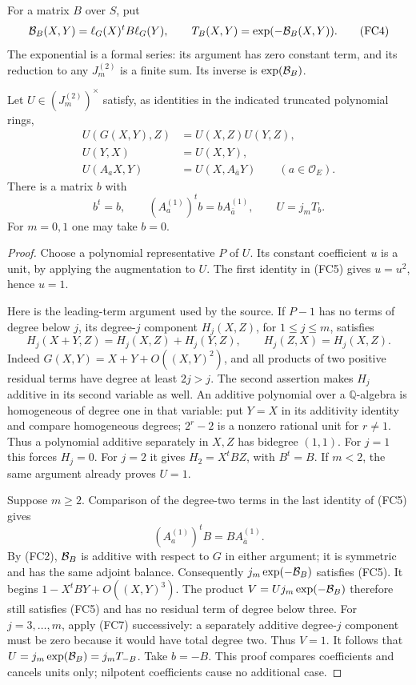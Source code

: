 For a matrix \(B\) over \(S\), put
\[
 {\cal B}_B(X,Y)=\ell_G(X)^tB\ell_G(Y),\qquad
 T_B(X,Y)=\exp(-{\cal B}_B(X,Y)).
 \tag{FC4}
\]
The exponential is a formal series: its argument has
zero constant term, and its reduction to any \(J_m^{(2)}\)
is a finite sum.  Its inverse is \(\exp({\cal B}_B)\).

\begin{srlemma}
\label{lem:sr-source-pair-discrepancy-exponential}
Let \(U\in(J_m^{(2)})^\times\) satisfy, as identities in
the indicated truncated polynomial rings,
\[
 \begin{split}
 U(G(X,Y),Z)&=U(X,Z)U(Y,Z),\\
 U(Y,X)&=U(X,Y),\\
 U(A_aX,Y)&=U(X,A_{\bar a}Y)\qquad(a\in\mathcal O_E).
 \end{split}                                                   \tag{FC5}
\]
There is a matrix \(b\) with
\[
 b^t=b,\qquad (A_a^{(1)})^tb=bA_{\bar a}^{(1)},\qquad
                         U=j_mT_b.                           \tag{FC6}
\]
For \(m=0,1\) one may take \(b=0\).
\end{srlemma}
\begin{proof}
Choose a polynomial representative \(P\) of \(U\).
Its constant coefficient \(u\) is a unit, by applying
the augmentation to \(U\).
The first identity in (FC5) gives \(u=u^2\), hence \(u=1\).

Here is the leading-term argument used by the source.
If \(P-1\) has no terms of degree below \(j\), its
degree-\(j\) component \(H_j(X,Z)\), for \(1\le j\le m\),
satisfies
\[
 H_j(X+Y,Z)=H_j(X,Z)+H_j(Y,Z),\qquad H_j(Z,X)=H_j(X,Z).
 \tag{FC7}
\]
Indeed \(G(X,Y)=X+Y+O((X,Y)^2)\), and all products
of two positive residual terms have degree at least
\(2j>j\).
The second assertion makes \(H_j\) additive in its
second variable as well.
An additive polynomial over a \(\mathbb Q\)-algebra
is homogeneous of degree one in that variable:
put \(Y=X\) in its additivity identity and compare
homogeneous degrees; \(2^r-2\) is a nonzero rational
unit for \(r\ne1\).
Thus a polynomial additive separately in \(X,Z\) has
bidegree \((1,1)\).
For \(j=1\) this forces \(H_j=0\).
For \(j=2\) it gives \(H_2=X^tBZ\), with \(B^t=B\).
If \(m<2\), the same argument already proves \(U=1\).

Suppose \(m\ge2\).
Comparison of the degree-two terms in the last identity
of (FC5) gives
\[
                 (A_a^{(1)})^tB=BA_{\bar a}^{(1)}.            \tag{FC8}
\]
By (FC2), \({\cal B}_B\) is additive with respect to \(G\)
in either argument; it is symmetric and has the same
adjoint balance.
Consequently \(j_m\exp(-{\cal B}_B)\) satisfies (FC5).
It begins \(1-X^tBY+O((X,Y)^3)\).
The product
\(V=Uj_m\exp(-{\cal B}_B)\) therefore still satisfies
(FC5) and has no residual term of degree below three.
For \(j=3,\ldots,m\), apply (FC7) successively:
a separately additive degree-\(j\) component must be
zero because it would have total degree two.
Thus \(V=1\).
It follows that \(U=j_m\exp({\cal B}_B)=j_mT_{-B}\).
Take \(b=-B\).
This proof compares coefficients and cancels units only;
nilpotent coefficients cause no additional case.
\end{proof}

